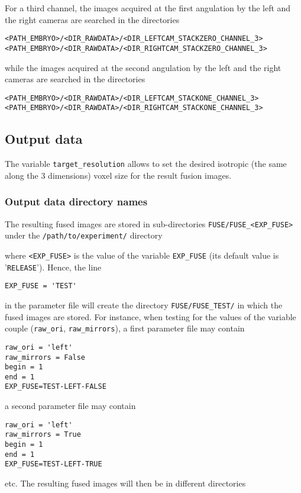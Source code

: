 For a third channel, 
the images acquired at the first angulation by the
left and the right cameras are searched in the directories
\begin{verbatim}
<PATH_EMBRYO>/<DIR_RAWDATA>/<DIR_LEFTCAM_STACKZERO_CHANNEL_3>
<PATH_EMBRYO>/<DIR_RAWDATA>/<DIR_RIGHTCAM_STACKZERO_CHANNEL_3>
\end{verbatim}
while the images acquired at the second angulation by the
left and the right cameras are searched in the directories
\begin{verbatim}
<PATH_EMBRYO>/<DIR_RAWDATA>/<DIR_LEFTCAM_STACKONE_CHANNEL_3>
<PATH_EMBRYO>/<DIR_RAWDATA>/<DIR_RIGHTCAM_STACKONE_CHANNEL_3>
\end{verbatim}



\subsection{Output data}
\label{sec:cli:fuse:output:data}

The variable \texttt{target\_resolution} allows to set the desired isotropic (the
same along the 3 dimensions) voxel size for the result fusion
images.

\subsubsection{Output data directory names}

The resulting fused images are stored in sub-directories
\texttt{FUSE/FUSE\_<EXP\_FUSE>} under the \texttt{/path/to/experiment/} directory

\mbox{}
\mbox{}

where \texttt{<EXP\_FUSE>} is the value of the variable \texttt{EXP\_FUSE} (its
default value is '\texttt{RELEASE}'). Hence, the line
\begin{verbatim}
EXP_FUSE = 'TEST'
\end{verbatim}
in the parameter file will create the directory
\texttt{FUSE/FUSE\_TEST/} in which the fused images are stored. For
instance, when testing for the values of the variable couple
(\texttt{raw\_ori}, \texttt{raw\_mirrors}), a first parameter file may
contain
\begin{verbatim}
raw_ori = 'left'
raw_mirrors = False
begin = 1
end = 1
EXP_FUSE=TEST-LEFT-FALSE
\end{verbatim}
a second parameter file may
contain
\begin{verbatim}
raw_ori = 'left'
raw_mirrors = True
begin = 1
end = 1
EXP_FUSE=TEST-LEFT-TRUE
\end{verbatim}
etc. The resulting fused images will then be in different directories

